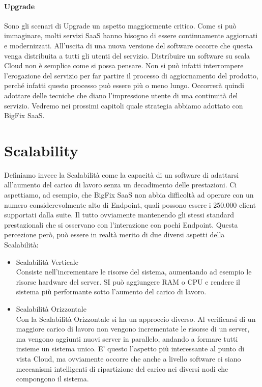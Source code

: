 \paragraph{Upgrade}
Sono gli scenari di Upgrade un aspetto maggiormente critico. Come si può immaginare, molti servizi SaaS hanno bisogno di essere continuamente aggiornati e modernizzati. All'uscita di una nuova versione del software occorre che questa venga distribuita a tutti gli utenti del servizio. Distribuire un software su scala Cloud non è semplice come si possa pensare. Non si può infatti interrompere l'erogazione del servizio per far partire il processo di aggiornamento del prodotto, perché infatti questo processo può essere più o meno lungo. Occorrerà quindi adottare delle tecniche che diano l'impressione utente di una continuità del servizio. Vedremo nei prossimi capitoli quale strategia abbiamo adottato con BigFix SaaS. 

\section{Scalability}
Definiamo invece la Scalabilità come la capacità di un software di adattarsi all'aumento del carico di lavoro senza un decadimento delle prestazioni. Ci aspettiamo, ad esempio, che BigFix SaaS non abbia difficoltà ad operare con un numero considerevolmente alto di Endpoint, quali possono essere i 250.000 client supportati dalla suite. Il tutto ovviamente mantenendo gli stessi standard prestazionali che si osservano con l'interazione con pochi Endpoint. Questa percezione però, può essere in realtà merito di due diversi aspetti della Scalabilità:
\begin{itemize}
	\item  Scalabilità Verticale \\
	Consiste nell'incrementare le risorse del sistema, aumentando ad esempio le risorse hardware del server. SI può aggiungere RAM o CPU e rendere il sistema più performante sotto l'aumento del carico di lavoro.
	
	\item  Scalabilità Orizzontale \\
	Con la Scalabilità Orizzontale si ha un approccio diverso. Al verificarsi di un maggiore carico di lavoro non vengono incrementate le risorse di un server, ma vengono aggiunti nuovi server in parallelo, andando a formare tutti insieme un sistema unico. E' questo l'aspetto più interessante al punto di vista Cloud, ma ovviamente occorre che anche a livello software ci siano meccanismi intelligenti di ripartizione del carico nei diversi nodi che  compongono il sistema.
\end{itemize}

